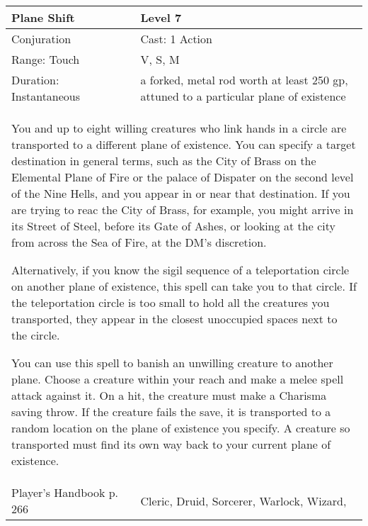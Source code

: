\documentclass[11pt]{report}
\begin{document}
\begin{table}[H]
	\begin{tabular}{||p{6cm}|p{6cm}||}
		\hline\hline
		\bf{Plane Shift} & Level 7\\ \hline
		Conjuration & Cast: 1 Action\\ \hline
		Range: Touch & V, S, M\\ \hline
		Duration: Instantaneous & a forked, metal rod worth at least 250 gp, attuned to a particular plane of existence\\ \hline
		\multicolumn{2}{||p{12cm}||}{You and up to eight willing creatures who link hands in a circle are transported to a different plane of existence. You can specify a target destination in general terms, such as the City of Brass on the Elemental Plane of Fire or the palace of Dispater on the second level of the Nine Hells, and you appear in or near that destination. If you are trying to reac the City of Brass, for example, you might arrive in its Street of Steel, before its Gate of Ashes, or looking at the city from across the Sea of Fire, at the DM’s discretion.

Alternatively, if you know the sigil sequence of a teleportation circle on another plane of existence, this spell can take you to that circle. If the teleportation circle is too small to hold all the creatures you transported, they appear in the closest unoccupied spaces next to the circle.

You can use this spell to banish an unwilling creature to another plane. Choose a creature within your reach and make a melee spell attack against it. On a hit, the creature must make a Charisma saving throw. If the creature fails the save, it is transported to a random location on the plane of existence you specify. A creature so transported must find its own way back to your current plane of existence.}\\ \hline
Player's Handbook p. 266 & Cleric, Druid, Sorcerer, Warlock, Wizard, \\ \hline\hline
	\end{tabular}
\end{table}
\end{document}
